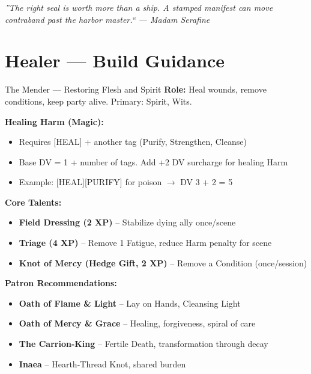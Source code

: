 \documentclass[10pt]{article}
\begin{document}
\vspace{0.5em}
\begin{center}
    {\small\sffamily\itshape ''The right seal is worth more than a ship. A stamped manifest can move contraband past the harbor master.`` --- Madam Serafine}
\end{center}

\newpage


\section*{Healer --- Build Guidance}

\begin{tipbox}{The Mender --- Restoring Flesh and Spirit}
    \textbf{Role:} Heal wounds, remove conditions, keep party alive. Primary: Spirit, Wits.
    
    \textbf{Healing Harm (Magic):}
    \begin{itemize}
        \item Requires [HEAL] + another tag (Purify, Strengthen, Cleanse)
        \item Base DV = 1 + number of tags. Add +2 DV surcharge for healing Harm
        \item Example: [HEAL][PURIFY] for poison $\rightarrow$ DV 3 + 2 = 5
    \end{itemize}
    
    \textbf{Core Talents:}
    \begin{itemize}
        \item \textbf{Field Dressing (2 XP)} -- Stabilize dying ally once/scene
        \item \textbf{Triage (4 XP)} -- Remove 1 Fatigue, reduce Harm penalty for scene
        \item \textbf{Knot of Mercy (Hedge Gift, 2 XP)} -- Remove a Condition (once/session)
    \end{itemize}
    
    \textbf{Patron Recommendations:}
    \begin{itemize}
        \item \textbf{Oath of Flame \& Light} -- Lay on Hands, Cleansing Light
        \item \textbf{Oath of Mercy \& Grace} -- Healing, forgiveness, spiral of care
        \item \textbf{The Carrion-King} -- Fertile Death, transformation through decay
        \item \textbf{Inaea} -- Hearth-Thread Knot, shared burden
    \end{itemize}
\end{tipbox}
\end{document}
